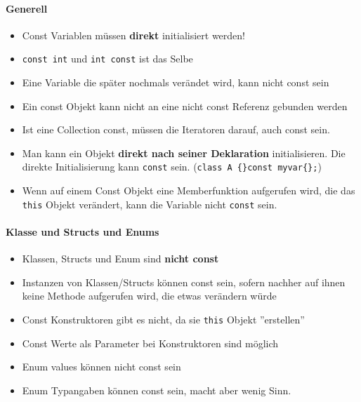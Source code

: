 \paragraph{Generell}
\begin{itemize}
	\item Const Variablen müssen \textbf{direkt} initialisiert werden!
	\item \lstinline|const int| und \lstinline|int const| ist das Selbe
	\item Eine Variable die später nochmals verändet wird, kann nicht const sein
	\item Ein const Objekt kann nicht an eine nicht const Referenz gebunden werden
	\item Ist eine Collection const, müssen die Iteratoren darauf, auch const sein.
	\item Man kann ein Objekt \textbf{direkt nach seiner Deklaration} initialisieren. Die direkte Initialisierung kann \lstinline|const| sein. (\lstinline|class A {}const myvar{};|)
	\item Wenn auf einem Const Objekt eine Memberfunktion aufgerufen wird, die das \lstinline|this| Objekt verändert, kann die Variable nicht \lstinline|const| sein.
\end{itemize}

\paragraph{Klasse und Structs und Enums}
\begin{itemize}
	\item Klassen, Structs und Enum sind \textbf{nicht const}
	\item Instanzen von Klassen/Structs können const sein, sofern nachher auf ihnen keine Methode aufgerufen wird, die etwas verändern würde
	\item Const Konstruktoren gibt es nicht, da sie \lstinline|this| Objekt ''erstellen''
	\item Const Werte als Parameter bei Konstruktoren sind möglich
	\item Enum values können nicht const sein
	\item Enum Typangaben können const sein, macht aber wenig Sinn.
\end{itemize}

